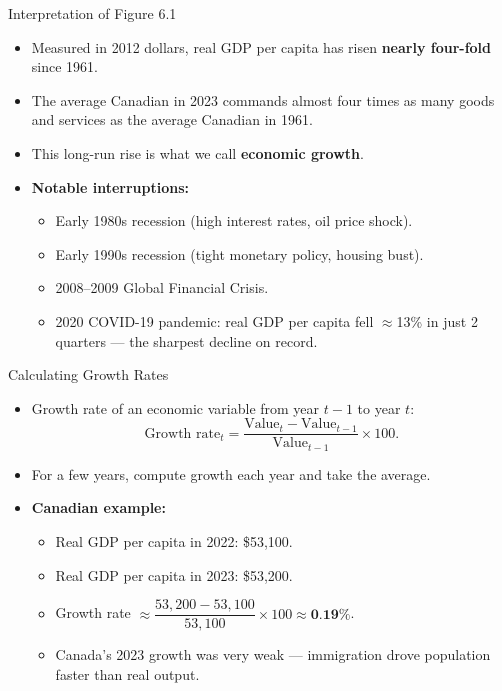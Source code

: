 \documentclass[aspectratio=169]{beamer}
\begin{document}
\begin{frame}{Interpretation of Figure 6.1}
\transfade
\begin{itemize}
  \item Measured in 2012 dollars, real GDP per capita has risen \textbf{nearly four-fold} since 1961.
  \item The average Canadian in 2023 commands \alert{almost four times as many} goods and services as the average Canadian in 1961.
  \item This long-run rise is what we call \textbf{economic growth}.
  \item \textbf{Notable interruptions:}
  \begin{itemize}
    \item Early 1980s recession (high interest rates, oil price shock).
    \item Early 1990s recession (tight monetary policy, housing bust).
    \item 2008--2009 Global Financial Crisis.
    \item \alert{2020 COVID-19 pandemic}: real GDP per capita fell $\approx$13\% in just 2 quarters --- the sharpest decline on record.
  \end{itemize}
\end{itemize}
\end{frame}


\begin{frame}{Calculating Growth Rates}
\transfade
\begin{itemize}
  \item Growth rate of an economic variable from year $t-1$ to year $t$:
  \[
    \text{Growth rate}_t = \frac{\text{Value}_t - \text{Value}_{t-1}}{\text{Value}_{t-1}} \times 100.
  \]
  \item For a few years, compute growth each year and take the average.
  \item \textbf{Canadian example:}
  \begin{itemize}
    \item Real GDP per capita in 2022: \$53,100.
    \item Real GDP per capita in 2023: \$53,200.
    \item Growth rate $\approx \dfrac{53{,}200 - 53{,}100}{53{,}100} \times 100 \approx \textbf{0.19\%}$.
    \item \textcolor{canadared}{Canada's 2023 growth was very weak --- immigration drove population faster than real output.}
  \end{itemize}
\end{itemize}
\end{frame}
\end{document}
